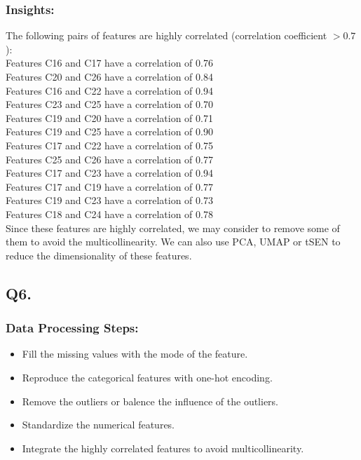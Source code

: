 \documentclass{article}
\begin{document}
\subsubsection*{Insights:}
The following pairs of features are highly correlated (correlation coefficient $> 0.7$):\\
Features C16 and C17 have a correlation of 0.76\\
Features C20 and C26 have a correlation of 0.84\\
Features C16 and C22 have a correlation of 0.94\\
Features C23 and C25 have a correlation of 0.70\\
Features C19 and C20 have a correlation of 0.71\\
Features C19 and C25 have a correlation of 0.90\\
Features C17 and C22 have a correlation of 0.75\\
Features C25 and C26 have a correlation of 0.77\\
Features C17 and C23 have a correlation of 0.94\\
Features C17 and C19 have a correlation of 0.77\\
Features C19 and C23 have a correlation of 0.73\\
Features C18 and C24 have a correlation of 0.78\\

Since these features are highly correlated, we may consider to remove some of them to avoid the multicollinearity.
We can also use PCA, UMAP or tSEN to reduce the dimensionality of these features.

\subsection*{Q6.}
\subsubsection*{Data Processing Steps:}
\begin{itemize}
    \item Fill the missing values with the mode of the feature.
    \item Reproduce the categorical features with one-hot encoding.
    \item Remove the outliers or balence the influence of the outliers.
    \item Standardize the numerical features.
    \item Integrate the highly correlated features to avoid multicollinearity.
\end{itemize}
\end{document}
